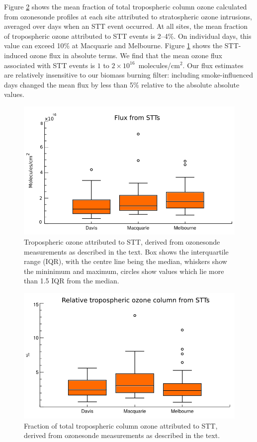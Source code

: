 \documentclass{article}
\begin{document}
  Figure \ref{fig:fluxsummary} shows the mean fraction of total tropospheric column ozone calculated from ozonesonde profiles at each site attributed to stratospheric ozone intrusions, averaged over days when an STT event occurred.
  At all sites, the mean fraction of tropospheric ozone attributed to STT events is 2--4\%. On individual days, this value can exceed 10\% at Macquarie and Melbourne.
  Figure \ref{fig:fluxsummaryabs} shows the STT-induced ozone flux in absolute terms.
  We find that the mean ozone flux associated with STT events is $1$ to $2 \times 10^{16}$~molecules/cm$^2$.
  Our flux estimates are relatively insensitive to our biomass burning filter: including smoke-influenced days changed the mean flux by less than 5\% relative to the absolute absolute values.
  
  \begin{figure}[!htbp]
    \begin{center}
    \includegraphics[width=0.8\columnwidth]{figures/flux_absolute.png}
    \caption{Tropospheric ozone attributed to STT, derived from ozonesonde measurements as described in the text.
      Box shows the interquartile range (IQR), with the centre line being the median, whiskers show the mininimum and maximum, circles show values which lie more than 1.5 IQR from the median.}
    \label{fig:fluxsummaryabs}
    \end{center}
  \end{figure}
  \begin{figure}[!htbp]
    \begin{center}
    \includegraphics[width=0.8\columnwidth]{figures/flux_relative.png}
    \caption{Fraction of total tropospheric column ozone attributed to STT, derived from ozonesonde measurements as described in the text.}
    \label{fig:fluxsummary}
    \end{center}
  \end{figure}
  
\end{document}
